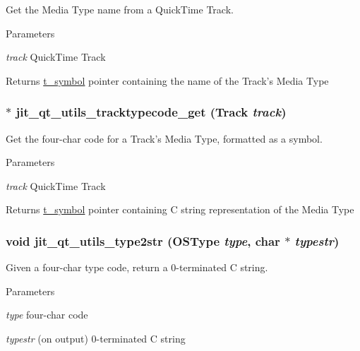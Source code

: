Get the Media Type name from a QuickTime Track. 
\begin{DoxyParams}{Parameters}
\item[{\em track}]QuickTime Track\end{DoxyParams}
\begin{DoxyReturn}{Returns}
\hyperlink{structt__symbol}{t\_\-symbol} pointer containing the name of the Track's Media Type 
\end{DoxyReturn}
\hypertarget{group__qtutilsmod_ga9258bae6c967cb61ffe467a2d1281dcb}{
\subsubsection[{jit\_\-qt\_\-utils\_\-tracktypecode\_\-get}]{$\ast$ jit\_\-qt\_\-utils\_\-tracktypecode\_\-get (Track {\em track})}}
\label{group__qtutilsmod_ga9258bae6c967cb61ffe467a2d1281dcb}


Get the four-\/char code for a Track's Media Type, formatted as a symbol. 
\begin{DoxyParams}{Parameters}
\item[{\em track}]QuickTime Track\end{DoxyParams}
\begin{DoxyReturn}{Returns}
\hyperlink{structt__symbol}{t\_\-symbol} pointer containing C string representation of the Media Type 
\end{DoxyReturn}
\hypertarget{group__qtutilsmod_gaa83e55dd7e304559597726c3f0ae6287}{
\subsubsection[{jit\_\-qt\_\-utils\_\-type2str}]{\setlength{\rightskip}{0pt plus 5cm}void jit\_\-qt\_\-utils\_\-type2str (OSType {\em type}, \/  char $\ast$ {\em typestr})}}
\label{group__qtutilsmod_gaa83e55dd7e304559597726c3f0ae6287}


Given a four-\/char type code, return a 0-\/terminated C string. 
\begin{DoxyParams}{Parameters}
\item[{\em type}]four-\/char code \item[{\em typestr}](on output) 0-\/terminated C string \end{DoxyParams}

